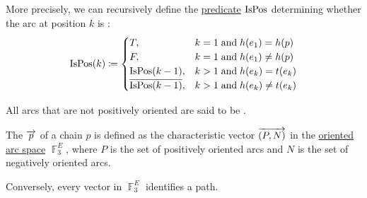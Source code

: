 \begin{definition}
\begin{thmenum}
    More precisely, we can recursively define the \hyperref[def:boolean_function]{predicate} \( \operatorname{IsPos} \) determining whether the arc at position \( k \) is :
    \begin{equation*}
      \begin{aligned}
        \op{IsPos}(k) \coloneqq \begin{cases}
          T,                            &k = 1 \T{and} h(e_1) = h(p) \\
          F,                            &k = 1 \T{and} h(e_1) \neq h(p) \\
          \op{IsPos}(k - 1),            &k > 1 \T{and} h(e_k) = t(e_k) \\
          \overline{\op{IsPos}(k - 1)}, &k > 1 \T{and} h(e_k) \neq t(e_k)
        \end{cases}
      \end{aligned}
    \end{equation*}

    All arcs that are not positively oriented are said to be .

     The  \( \overrightarrow{p} \) of a chain \( p \) is defined as the characteristic vector \( \overrightarrow{(P, N)} \) in the \hyperref[def:graph_spaces/oriented_arc]{oriented arc space} \( \BbbF_3^E \), where \( P \) is the set of positively oriented arcs and \( N \) is the set of negatively oriented arcs.

    Conversely, every vector in \( \BbbF_3^E \) identifies a path.
  \end{thmenum}
\end{definition}


